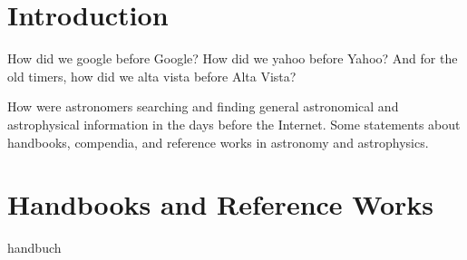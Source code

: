 

\section{Introduction}

How did we google before Google\texttrademark? How did we yahoo before
Yahoo\texttrademark? And for the old timers, how did we alta vista
before Alta Vista\texttrademark?

How were astronomers searching and finding general astronomical and
astrophysical information in the days before the Internet. Some
statements about handbooks, compendia, and reference works in 
astronomy and astrophysics.

\section{Handbooks and Reference Works}
{handbuch}
